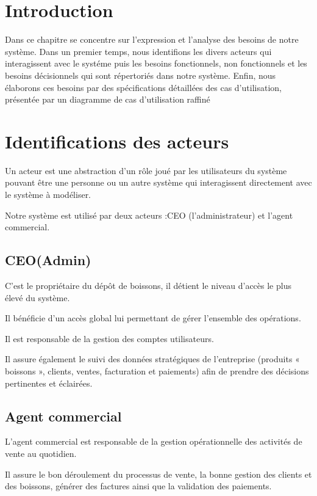 
\section{Introduction}
Dans ce chapitre se concentre sur l'expression et l'analyse des besoins de notre système.
Dans un premier temps, nous identifions les divers acteurs qui interagissent avec le systéme
puis les besoins fonctionnels, non fonctionnels et les besoins décisionnels qui sont répertoriés dans notre système.
Enfin, nous élaborons ces besoins par des  spécifications détaillées des cas d'utilisation, présentée par un diagramme  de cas d'utilisation raffiné
\section{Identifications des acteurs}
\label{sec:ch2:acteurs}

Un acteur est une abstraction d'un rôle joué par les utilisateurs du système pouvant être une personne ou un autre système qui interagissent directement avec le système à modéliser.

Notre système est utilisé par deux acteurs :CEO (l'administrateur) et l'agent commercial.

\subsection*{CEO(Admin)}

C'est le propriétaire du dépôt de boissons, il détient le niveau d'accès le plus élevé du système.

Il bénéficie d'un accès global lui permettant de gérer l'ensemble des opérations.

Il est responsable de la gestion des comptes utilisateurs.

Il assure également le suivi des données stratégiques de l'entreprise (produits « boissons », clients, ventes, facturation et paiements) afin de prendre des décisions pertinentes et éclairées.

\subsection*{Agent commercial}

L'agent commercial est responsable de la gestion opérationnelle des activités de vente au quotidien.

Il assure le bon déroulement du processus de vente, la bonne gestion des clients et des boissons, générer des factures ainsi que la validation des paiements.

